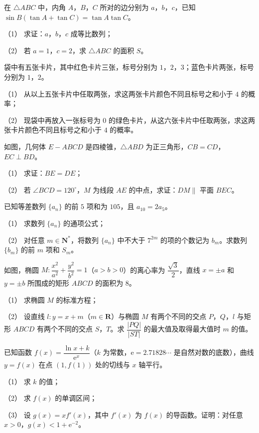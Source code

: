 \begin{question}
在 $\triangle ABC$ 中，内角 $A$，$B$，$C$ 所对的边分别为 $a$，$b$，$c$，已知 $\sin B(\tan A+\tan C)=\tan A\tan C$。

（1） 求证：$a$，$b$，$c$ 成等比数列；

（2） 若 $a=1$，$c=2$，求 $\triangle ABC$ 的面积 $S$。

\end{question}
\begin{question}
袋中有五张卡片，其中红色卡片三张，标号分别为 $1$，$2$，$3$；蓝色卡片两张，标号分别为 $1$，$2$。

（1） 从以上五张卡片中任取两张，求这两张卡片颜色不同且标号之和小于 $4$ 的概率；

（2） 现袋中再放入一张标号为 $0$ 的绿色卡片，从这六张卡片中任取两张，求这两张卡片颜色不同且标号之和小于 $4$ 的概率。

\Needspace{0.4\textheight}
\end{question}
\begin{question}
如图，几何体 $E-ABCD$ 是四棱锥，$\triangle ABD$ 为正三角形，$CB=CD$，$EC\perp BD$。

（1） 求证：$BE=DE$；

（2） 若 $\angle BCD=120^\circ$，$M$ 为线段 $AE$ 的中点，求证：$DM\parallel$ 平面 $BEC$。
\nopagebreak[4]
\begin{center}\end{center}
\nopagebreak[4]
\end{question}
\begin{question}
已知等差数列 $\{a_n\}$ 的前 $5$ 项和为 $105$，且 $a_{10}=2a_5$。

（1） 求数列 $\{a_n\}$ 的通项公式；

（2） 对任意 $m\in\mathbf N^*$，将数列 $\{a_n\}$ 中不大于 $7^{2m}$ 的项的个数记为 $b_m$。求数列 $\{b_m\}$ 的前 $m$ 项和 $S_m$。

\Needspace{0.4\textheight}
\end{question}
\begin{question}
如图，椭圆 $M:\dfrac{x^2}{a^2}+\dfrac{y^2}{b^2}=1$（$a>b>0$）的离心率为 $\dfrac{\sqrt3}2$，直线 $x=\pm a$ 和 $y=\pm b$ 所围成的矩形 $ABCD$ 的面积为 $8$。

（1） 求椭圆 $M$ 的标准方程；

（2） 设直线 $l:y=x+m$（$m\in\mathbf R$）与椭圆 $M$ 有两个不同的交点 $P$，$Q$，$l$ 与矩形 $ABCD$ 有两个不同的交点 $S$，$T$。求 $\dfrac{|PQ|}{|ST|}$ 的最大值及取得最大值时 $m$ 的值。
\nopagebreak[4]
\begin{center}\end{center}
\nopagebreak[4]
\end{question}
\begin{question}
已知函数 $f(x)=\dfrac{\ln x+k}{\mathrm e^x}$（$k$ 为常数，$\mathrm e=2.71828\cdots$ 是自然对数的底数），曲线 $y=f(x)$ 在点 $(1,f(1))$ 处的切线与 $x$ 轴平行。

（1） 求 $k$ 的值；

（2） 求 $f(x)$ 的单调区间；

（3） 设 $g(x)=xf'(x)$，其中 $f'(x)$ 为 $f(x)$ 的导函数。证明：对任意 $x>0$，$g(x)<1+\mathrm e^{-2}$。

\end{question}